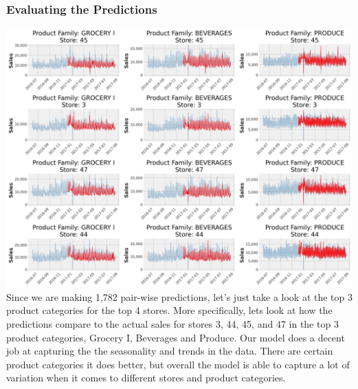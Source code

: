 \documentclass[12pt]{article}
\begin{document}
\subsubsection{Evaluating the Predictions}
\includegraphics[width=\textwidth]{figures/XGBoost.png}
Since we are making 1,782 pair-wise predictions, let's just take a look at the top 3 product categories for the top 4 stores.
More specifically, lets look at how the predictions compare to the actual sales for stores 3, 44, 45, and 47 in the top 3 product categories, Grocery I, Beverages and Produce.
Our model does a decent job at capturing the the seasonality and trends in the data. 
There are certain product categories it does better, but overall the model is able to capture a lot of variation when it comes to different stores and product categories.
\end{document}
